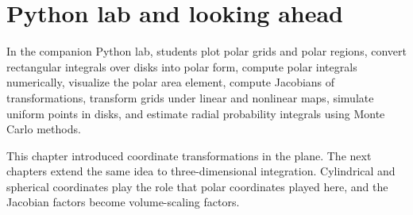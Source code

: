\documentclass[11pt]{article}
\begin{document}
\section{Python lab and looking ahead}

In the companion Python lab, students plot polar grids and polar regions, convert rectangular integrals over disks into polar form, compute polar integrals numerically, visualize the polar area element, compute Jacobians of transformations, transform grids under linear and nonlinear maps, simulate uniform points in disks, and estimate radial probability integrals using Monte Carlo methods.

This chapter introduced coordinate transformations in the plane. The next chapters extend the same idea to three-dimensional integration. Cylindrical and spherical coordinates play the role that polar coordinates played here, and the Jacobian factors become volume-scaling factors.
\end{document}
